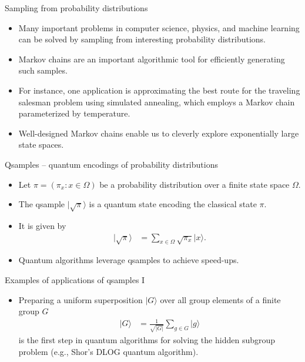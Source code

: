 \documentclass{beamer}
\renewcommand{\>}{\rangle}
\newcommand{\<}{\langle}
\begin{document}

\begin{frame}{Sampling from probability distributions}
\begin{itemize}
    \item Many important problems in computer science, physics, and machine learning can be solved by sampling from interesting probability distributions.

    \medskip
    \item Markov chains are an important algorithmic tool for efficiently generating such samples.

    \bigskip
    \item For instance, one application is approximating the best route for the traveling salesman problem using simulated annealing, which employs a Markov chain parameterized by temperature.

    \medskip
    \item Well-designed Markov chains enable us to cleverly explore exponentially large state spaces.
\end{itemize}
\end{frame}


\begin{frame}{Qsamples -- quantum encodings of probability distributions}

\begin{itemize}
    \item Let $\pi=(\pi_x : x \in \Omega)$ be a probability distribution over a finite state space $\Omega$.
    
    \medskip
    \item The qsample $|\sqrt{\pi}\>$ is a quantum state encoding the classical state $\pi$.
    
    \medskip
    \item It is given by
    \begin{align*}
        |\sqrt{\pi}\> 
        &=
        \sum_{x\in\Omega} \sqrt{\pi_x} |x\>.
    \end{align*}

    \item Quantum algorithms leverage qsamples to achieve speed-ups.
\end{itemize}
\end{frame}


\begin{frame}{Examples of applications of qsamples I}

\begin{itemize}
    \item Preparing a uniform superposition $|G\>$ over all group elements of a finite group $G$
    \begin{align*}
        |G\> 
        &= 
        \frac{1}{\sqrt{|G|}} \sum_{g\in G} |g\>
    \end{align*}
    is the first step in quantum algorithms for solving the hidden subgroup problem (e.g., Shor's DLOG quantum algorithm).
\end{itemize}
    
\end{frame}
\end{document}
